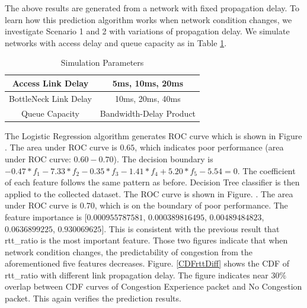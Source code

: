 \par The above results are generated from a network with fixed propagation delay. To learn how this prediction algorithm works when network condition changes, we investigate Scenario 1 and 2 with variations of propagation delay. We simulate networks with access delay and queue capacity as in Table \ref{tab:varyRTT}.
\begin{table}
\begin{center}
\caption {Simulation Parameters} \label{tab:varyRTT}
\begin{tabular}{ |c|c| }
 \hline
 Access Link Delay & 5ms, 10ms, 20ms  \\
 \hline
 BottleNeck Link Delay & 10ms, 20ms, 40ms\\
 \hline
 Queue Capacity & Bandwidth-Delay Product\\
 \hline
\end{tabular}
\end{center}
\end{table}
The Logistic Regression algorithm generates ROC curve which is shown in Figure . The area under ROC curve is $0.65$, which indicates poor performance (area under ROC curve: $0.60-0.70$). The decision boundary is $ -0.47*f_{1} - 7.33*f_{2} - 0.35
*f_{3} - 1.41*f_{4} + 5.20*f_{5} - 5.54 = 0$. The coefficient of each feature follows the same pattern as before. Decision Tree classifier is then applied to the collected dataset. The ROC curve is shown in Figure. . The area under ROC curve is $0.70$, which is on the boundary of poor performance. The feature importance is [$0.000955787581$, $0.000389816495$, $0.00489484823$, $0.0636899225$, $0.930069625$]. This is consistent with the previous result that rtt\_ratio is the most important feature. Those two figures indicate that when network condition changes, the predictability of congestion from the aforementioned five features decreases. Figure. \ref{CDFrttDiff} shows the CDF of rtt\_ratio with different link propagation delay. The figure indicates near $30\%$ overlap between CDF curves of Congestion Experience packet and No Congestion packet. This again verifies the prediction results.

